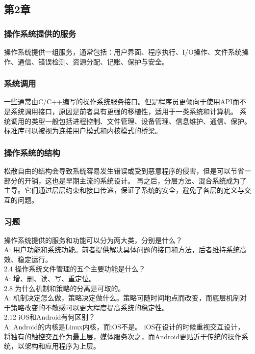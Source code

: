 \documentclass[../main.tex]{subfiles}
\begin{document}
    \subsection{第2章}
    \subsubsection{操作系统提供的服务}
    操作系统提供一组服务，通常包括：用户界面、程序执行、I/O操作、文件系统操作、通信、错误检测、资源分配、记账、保护与安全。
    \subsubsection{系统调用}
    一些通常由C/C++编写的操作系统服务接口。但是程序员更倾向于使用API而不是系统调用接口，原因是前者具有更强的移植性，适用于一类系统和计算机。
    系统调用的类型一般包括进程控制、文件管理、设备管理、信息维护、通信、保护。标准库可以被视为连接用户模式和内核模式的桥梁。
    \subsubsection{操作系统的结构}
    松散自由的结构会导致系统容易发生错误或受到恶意程序的侵害，但是可以节省一部分的开销，这也是早期主流的系统设计。
    再之后，分层方法、混合系统成为了主导。它们通过层层约束和接口传递，保证了系统的安全，避免了各层的定义与交互的问题。
    \subsubsection{习题}
     操作系统提供的服务和功能可以分为两大类，分别是什么？ \\
    A: 用户功能和系统功能。前者提供解决具体问题的接口和方法，后者维持系统高效、稳定运行。 \\
    2.4 操作系统文件管理的五个主要功能是什么？ \\
    A: 增、删、读、写、重定位。 \\
    2.8 为什么机制和策略的分离是可取的。 \\
    A: 机制决定怎么做，策略决定做什么。策略可随时间地点而改变，而底层机制对于策略改变的不敏感可以更大程度提高系统的稳定性。\\
    2.12 iOS和Android有何区别？ \\
    A: Android的内核是Linux内核，而iOS不是。
    iOS在设计的时候重视交互设计，将独有的触控交互作为最上层，媒体服务次之，而Android更贴近于传统的操作系统，以架构和应用程序为上层。
\end{document}
